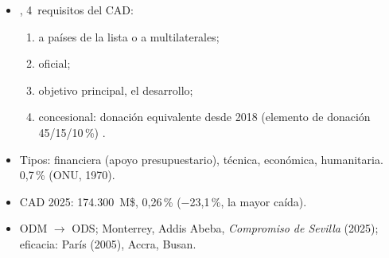 \documentclass{article}
\begin{document}
\begin{columnas}
\begin{itemize}
\item {}, 4~requisitos del CAD:
  \begin{enumerate}
  \item a países de la lista o a multilaterales;
  \item oficial;
  \item objetivo principal, el desarrollo;
  \item concesional: donación equivalente desde 2018 (elemento de donación 45/15/10\,\%) .
  \end{enumerate}
\item Tipos: financiera (apoyo presupuestario), técnica, económica, humanitaria. 0,7\,\% (ONU, 1970).
\end{itemize}
\begin{itemize}
\item CAD 2025: 174.300~M\$, 0,26\,\% ($-$23,1\,\%, la mayor caída).
\item ODM $\to$ ODS; Monterrey, Addis Abeba, \emph{Compromiso de Sevilla} (2025); eficacia: París (2005), Accra, Busan.
\end{itemize}


\end{columnas}
\end{document}
